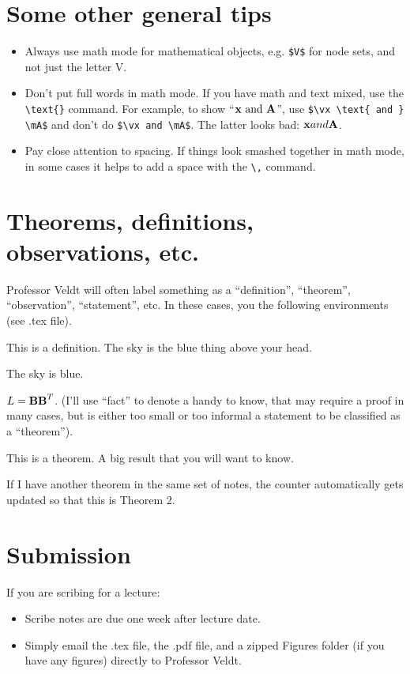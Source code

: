 \documentclass[11  pt]{article}
\begin{document}
\section{Some other general tips}

\begin{itemize}
	\item Always use math mode for mathematical objects, e.g. \verb|$V$| for node sets, and not just the letter V. 
	\item Don't put full words in math mode. If you have math and text mixed, use the \verb|\text{}| command. For example, to show ``$\textbf{x} \text{ and } \textbf{A}$'', use \verb|$\vx \text{ and } \mA$| and don't do \verb|$\vx and \mA$|. The latter looks bad: $\textbf{x} and \textbf{A}$.
	\item Pay close attention to spacing. If things look smashed together in math mode, in some cases it helps to add a space with the \verb|\,| command.
\end{itemize}

\section{Theorems, definitions, observations, etc.}

Professor Veldt will often label something as a ``definition'', ``theorem'', ``observation'', ``statement'', etc. In these cases, you the following environments (see .tex file).

\begin{definition}
	This is a definition. The sky is the blue thing above your head.
\end{definition}

\begin{observation}
	The sky is blue.
\end{observation}

\begin{fact}
	$L = \textbf{B} \textbf{B}^T$. (I'll use ``fact'' to denote a handy to know, that may require a proof in many cases, but is either too small or too informal a statement to be classified as a ``theorem'').
\end{fact}

\begin{theorem}
	This is a theorem. A big result that you will want to know. 
\end{theorem}

\begin{theorem}
	If I have another theorem in the same set of notes, the counter automatically gets updated so that this is Theorem 2.
\end{theorem}

\section{Submission}

If you are scribing for a lecture:
\begin{itemize}
	\item Scribe notes are due one week after lecture date.
	\item Simply email the .tex file, the .pdf file, and a zipped Figures folder (if you have any figures) directly to Professor Veldt.
\end{itemize}
\end{document}
